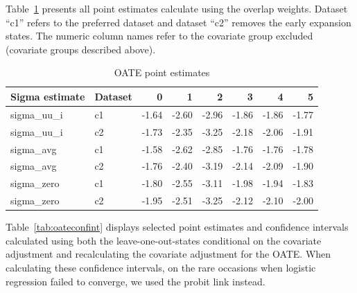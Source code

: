 \documentclass[12pt]{article}
\begin{document}
Table~\ref{tab:oatesensitive} presents all point estimates calculate using the overlap weights. Dataset ``c1'' refers to the preferred dataset and dataset ``c2'' removes the early expansion states. The numeric column names refer to the covariate group excluded (covariate groups described above).

\begin{table}[ht]
\begin{tabular}{llrrrrrr}
  \toprule
Sigma estimate & Dataset & 0 & 1 & 2 & 3 & 4 & 5 \\ 
  \midrule
sigma\_uu\_i & c1 & -1.64 & -2.60 & -2.96 & -1.86 & -1.86 & -1.77 \\ 
  sigma\_uu\_i & c2 & -1.73 & -2.35 & -3.25 & -2.18 & -2.06 & -1.91 \\ 
  sigma\_avg & c1 & -1.58 & -2.62 & -2.85 & -1.76 & -1.76 & -1.78 \\ 
  sigma\_avg & c2 & -1.76 & -2.40 & -3.19 & -2.14 & -2.09 & -1.90 \\ 
  sigma\_zero & c1 & -1.80 & -2.55 & -3.11 & -1.98 & -1.94 & -1.83 \\ 
  sigma\_zero & c2 & -1.95 & -2.51 & -3.25 & -2.12 & -2.10 & -2.00 \\ 
   \bottomrule
\end{tabular}
\caption{OATE point estimates}
\label{tab:oatesensitive}
\end{table}

Table~\ref{tab:oateconfint} displays selected point estimates and confidence intervals calculated using both the leave-one-out-states conditional on the covariate adjustment and recalculating the covariate adjustment for the OATE. When calculating these confidence intervals, on the rare occasions when logistic regression failed to converge, we used the probit link instead.
\end{document}
